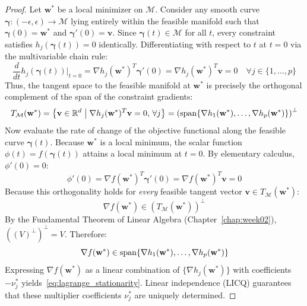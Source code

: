 \begin{proof}
Let $\mathbf{w}^*$ be a local minimizer on $\mathcal{M}$. Consider any smooth curve $\boldsymbol{\gamma}: (-\epsilon, \epsilon) \to \mathcal{M}$ lying entirely within the feasible manifold such that $\boldsymbol{\gamma}(0) = \mathbf{w}^*$ and $\boldsymbol{\gamma}'(0) = \mathbf{v}$.
Since $\boldsymbol{\gamma}(t) \in \mathcal{M}$ for all $t$, every constraint satisfies $h_j(\boldsymbol{\gamma}(t)) = 0$ identically. Differentiating with respect to $t$ at $t = 0$ via the multivariable chain rule:
\begin{equation}
\frac{d}{dt} h_j(\boldsymbol{\gamma}(t))\Big|_{t=0} = \nabla h_j(\mathbf{w}^*)^T \boldsymbol{\gamma}'(0) = \nabla h_j(\mathbf{w}^*)^T \mathbf{v} = 0 \quad \forall j \in \{1, \dots, p\}
\end{equation}
Thus, the tangent space to the feasible manifold at $\mathbf{w}^*$ is precisely the orthogonal complement of the span of the constraint gradients:
\begin{equation}
T_{\mathcal{M}}(\mathbf{w}^*) = \left\{ \mathbf{v} \in \mathbb{R}^d \;\middle|\; \nabla h_j(\mathbf{w}^*)^T \mathbf{v} = 0, \, \forall j \right\} = \left( \operatorname{span}\{\nabla h_1(\mathbf{w}^*), \dots, \nabla h_p(\mathbf{w}^*)\} \right)^\perp
\end{equation}
Now evaluate the rate of change of the objective functional along the feasible curve $\boldsymbol{\gamma}(t)$. Because $\mathbf{w}^*$ is a local minimum, the scalar function $\phi(t) = f(\boldsymbol{\gamma}(t))$ attains a local minimum at $t = 0$. By elementary calculus, $\phi'(0) = 0$:
\begin{equation}
\phi'(0) = \nabla f(\mathbf{w}^*)^T \boldsymbol{\gamma}'(0) = \nabla f(\mathbf{w}^*)^T \mathbf{v} = 0
\end{equation}
Because this orthogonality holds for \emph{every} feasible tangent vector $\mathbf{v} \in T_{\mathcal{M}}(\mathbf{w}^*)$:
\begin{equation}
\nabla f(\mathbf{w}^*) \in \left( T_{\mathcal{M}}(\mathbf{w}^*) \right)^\perp
\end{equation}
By the Fundamental Theorem of Linear Algebra (Chapter~\ref{chap:week02}), $\left( (V)^\perp \right)^\perp = V$. Therefore:
\begin{equation}
\nabla f(\mathbf{w}^*) \in \operatorname{span}\{\nabla h_1(\mathbf{w}^*), \dots, \nabla h_p(\mathbf{w}^*)\}
\end{equation}
Expressing $\nabla f(\mathbf{w}^*)$ as a linear combination of $\{\nabla h_j(\mathbf{w}^*)\}$ with coefficients $-\nu_j^*$ yields~\eqref{eq:lagrange_stationarity}. Linear independence (LICQ) guarantees that these multiplier coefficients $\nu_j^*$ are uniquely determined.
\end{proof}

